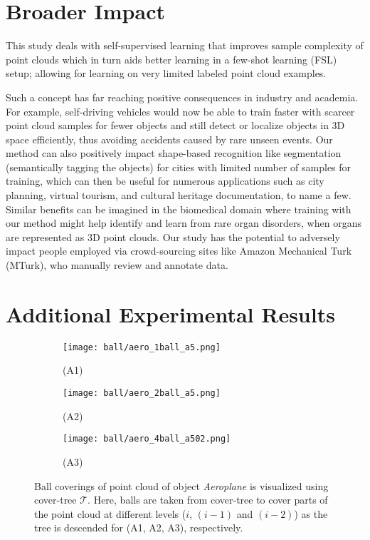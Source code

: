 \documentclass{article}
\begin{document}
\section*{Broader Impact}
This study deals with self-supervised learning that improves sample complexity of point clouds which in turn aids better learning in a few-shot learning (FSL) setup; allowing for learning on very limited labeled point cloud examples.

Such a concept has far reaching positive consequences in industry and academia. For example, self-driving vehicles would now be able to train faster with scarcer point cloud samples for fewer objects and still detect or localize objects in 3D space efficiently, thus avoiding accidents caused by rare unseen events.
Our method can also positively impact shape-based recognition like segmentation (semantically tagging the objects) for cities with limited number of samples for training, which can then be useful for numerous applications such as city planning, virtual tourism, and cultural heritage documentation, to name a few. Similar benefits can be imagined in the biomedical domain where training with our method might help identify and learn from rare organ disorders, when organs are represented as 3D point clouds. Our study has the potential to adversely impact people employed via crowd-sourcing sites like Amazon Mechanical Turk (MTurk), who manually review and annotate data.




\clearpage



\appendix
\section{Additional Experimental Results}
\begin{figure}[tbp]
	\centering
	\begin{subfigure}{.85\textwidth}
		\centering
		\texttt{[image: ball/aero\_1ball\_a5.png]}
		\caption{(A1)}
		\label{fig:ball1}
	\end{subfigure}
	\begin{subfigure}{.85\textwidth}
		\centering
		\texttt{[image: ball/aero\_2ball\_a5.png]}
		\caption{(A2)}
		\label{fig:ball2}
    \end{subfigure}
    \begin{subfigure}{.85\textwidth}
		\centering
		\texttt{[image: ball/aero\_4ball\_a502.png]}
		\caption{(A3)}
		\label{fig:ball3}
	\end{subfigure}
	
	\caption{Ball coverings of point cloud of object \emph{Aeroplane} is visualized using cover-tree $\mathcal{T}$. Here, balls are taken from cover-tree to cover parts of the point cloud at different levels ($i$, $(i-1)$ and $(i-2)$) as the tree is descended for (A1, A2, A3), respectively.}
	\label{fig:balls}
\end{figure}
\end{document}
